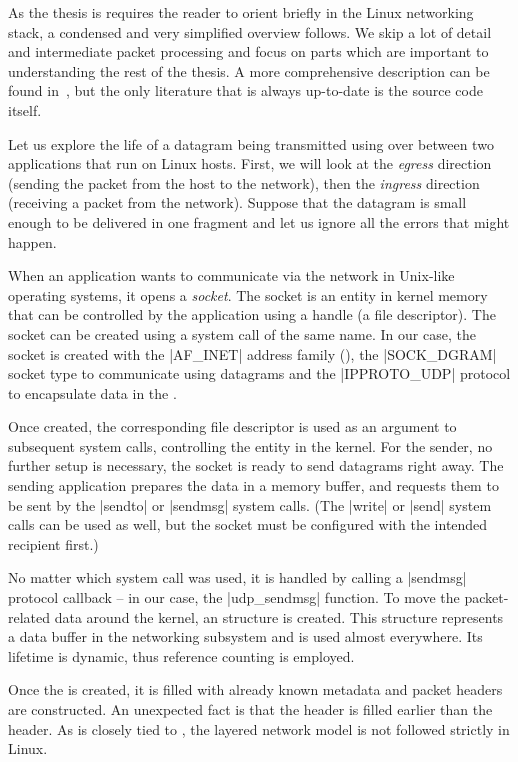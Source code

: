 As the thesis is requires the reader to orient briefly in the Linux networking stack,
a condensed and very simplified overview follows. We skip a lot of detail and
intermediate packet processing and focus on parts which are important to
understanding the rest of the thesis. A more comprehensive description can be
found in~\cite{lkn-iat}, but the only literature that is always up-to-date is
the source code itself.

Let us explore the life of a datagram being transmitted using  over
 between two applications that run on Linux hosts. First, we will look
at the \emph{egress} direction (sending the packet from the host to the
network), then the \emph{ingress} direction (receiving a packet from the
network). Suppose that the datagram is small enough to be delivered
in one  fragment and let us ignore all the errors that might happen.

When an application wants to communicate via the network in Unix-like operating
systems, it opens a \emph{socket}. The socket is an entity in kernel memory that
can be controlled by the application using a handle (a file descriptor). The
socket can be created using a system call of
the same name. In our case, the socket is created with the \macro|AF_INET| address
family (), the \macro|SOCK_DGRAM| socket type to communicate using
datagrams and the \macro|IPPROTO_UDP| protocol to encapsulate data in the .

Once created, the corresponding file descriptor is used as an argument to
subsequent system calls, controlling the entity in the kernel. For the sender,
no further setup is necessary, the socket is ready to send datagrams right away.
The sending application prepares the data in a memory buffer, and requests them
to be sent by the \fnc|sendto| or \fnc|sendmsg| system calls. (The \fnc|write|
or \fnc|send| system calls can be used as well, but the socket must be
configured with the intended recipient first.)

No matter which system call was used, it is handled by calling a \fnc|sendmsg|
protocol callback -- in our case, the \fnc|udp_sendmsg| function. To move
the packet-related data around the kernel, an \skb{} structure is created. This
structure represents a data buffer in the networking subsystem and is used
almost everywhere. Its lifetime is dynamic, thus reference counting is
employed.

Once the \skb{} is created, it is filled with already known metadata and packet
headers are constructed. An unexpected fact is that the  header is
filled earlier than the  header. As  is closely tied to
, the layered network model is not followed strictly in Linux.

